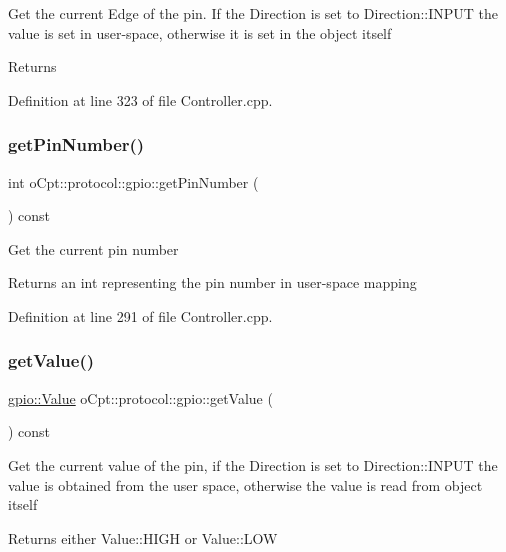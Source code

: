 Get the current Edge of the pin. If the Direction is set to Direction\+::\+I\+N\+P\+UT the value is set in user-\/space, otherwise it is set in the object itself \begin{DoxyReturn}{Returns}

\end{DoxyReturn}


Definition at line 323 of file Controller.\+cpp.

\hypertarget{classo_cpt_1_1protocol_1_1gpio_a66f03a0097a751d56f046e1537432291}{}\label{classo_cpt_1_1protocol_1_1gpio_a66f03a0097a751d56f046e1537432291} 
\subsubsection{\texorpdfstring{get\+Pin\+Number()}{getPinNumber()}}
{\footnotesize\ttfamily int o\+Cpt\+::protocol\+::gpio\+::get\+Pin\+Number (\begin{DoxyParamCaption}{ }\end{DoxyParamCaption}) const}

Get the current pin number \begin{DoxyReturn}{Returns}
an int representing the pin number in user-\/space mapping 
\end{DoxyReturn}


Definition at line 291 of file Controller.\+cpp.

\hypertarget{classo_cpt_1_1protocol_1_1gpio_a036e04db41883ec0e33dc9cf279a51f9}{}\label{classo_cpt_1_1protocol_1_1gpio_a036e04db41883ec0e33dc9cf279a51f9} 
\subsubsection{\texorpdfstring{get\+Value()}{getValue()}}
{\footnotesize\ttfamily \hyperlink{classo_cpt_1_1protocol_1_1gpio_a7d2d1d34f177f209ad642098d168656f}{gpio\+::\+Value} o\+Cpt\+::protocol\+::gpio\+::get\+Value (\begin{DoxyParamCaption}{ }\end{DoxyParamCaption}) const}

Get the current value of the pin, if the Direction is set to Direction\+::\+I\+N\+P\+UT the value is obtained from the user space, otherwise the value is read from object itself \begin{DoxyReturn}{Returns}
either Value\+::\+H\+I\+GH or Value\+::\+L\+OW 
\end{DoxyReturn}


